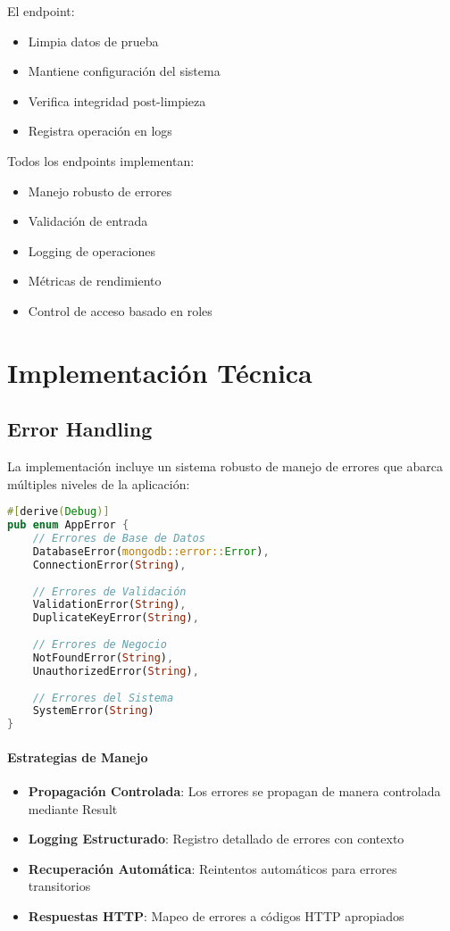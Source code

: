 \documentclass[12pt,letterpaper]{article}
\begin{document}
El endpoint:
\begin{itemize}
    \item Limpia datos de prueba
    \item Mantiene configuración del sistema
    \item Verifica integridad post-limpieza
    \item Registra operación en logs
\end{itemize}

Todos los endpoints implementan:
\begin{itemize}
    \item Manejo robusto de errores
    \item Validación de entrada
    \item Logging de operaciones
    \item Métricas de rendimiento
    \item Control de acceso basado en roles
\end{itemize}
\section{Implementación Técnica}
\subsection{Error Handling}
La implementación incluye un sistema robusto de manejo de errores que abarca múltiples niveles de la aplicación:

\begin{lstlisting}[language=rust]
#[derive(Debug)]
pub enum AppError {
    // Errores de Base de Datos
    DatabaseError(mongodb::error::Error),
    ConnectionError(String),
    
    // Errores de Validación
    ValidationError(String),
    DuplicateKeyError(String),
    
    // Errores de Negocio
    NotFoundError(String),
    UnauthorizedError(String),
    
    // Errores del Sistema
    SystemError(String)
}
\end{lstlisting}

\paragraph{Estrategias de Manejo}
\begin{itemize}
    \item \textbf{Propagación Controlada}: Los errores se propagan de manera controlada mediante Result
    \item \textbf{Logging Estructurado}: Registro detallado de errores con contexto
    \item \textbf{Recuperación Automática}: Reintentos automáticos para errores transitorios
    \item \textbf{Respuestas HTTP}: Mapeo de errores a códigos HTTP apropiados
\end{itemize}
\end{document}
